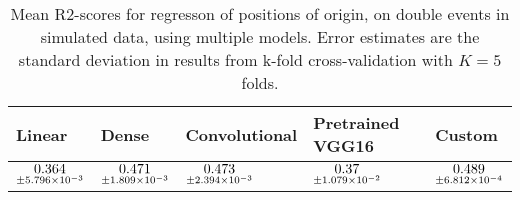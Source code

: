 \begin{table}
\centering
\caption{
Mean R2-scores for regresson of positions of origin, on double events in simulated data, using multiple models. 
Error estimates are the standard deviation in results from k-fold cross-validation 
with $K=5$ folds.
}
\label{tab:regression-simulated-double-position-r2}
\begin{tabular}{lllll}
\toprule
                                             Linear &                                               Dense &                                       Convolutional &                                   Pretrained VGG16 &                                              Custom \\
\midrule
 $\underset{\num{+- 5.796e-03 }  }{\num{ 0.364 } }$ &  $\underset{\num{+- 1.809e-03 }  }{\num{ 0.471 } }$ &  $\underset{\num{+- 2.394e-03 }  }{\num{ 0.473 } }$ &  $\underset{\num{+- 1.079e-02 }  }{\num{ 0.37 } }$ &  $\underset{\num{+- 6.812e-04 }  }{\num{ 0.489 } }$ \\
\bottomrule
\end{tabular}
\end{table}
